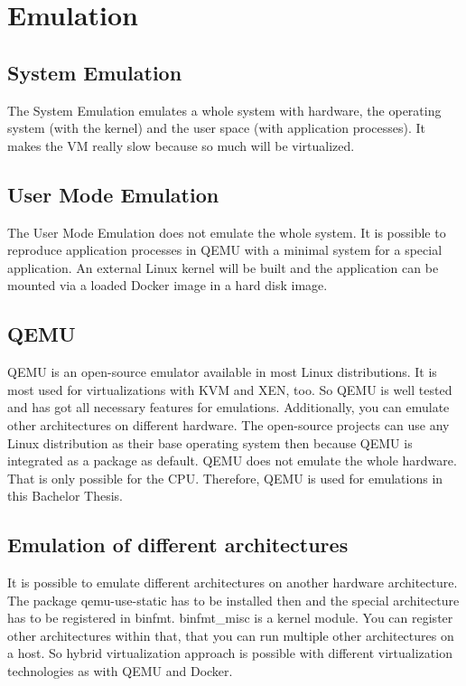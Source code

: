 \chapter{Emulation}\label{ch:emulation}

\section{System Emulation}

The System Emulation emulates a whole system with hardware, the operating system (with the kernel) and the user space (with application processes). It makes the VM really slow because so much will be virtualized.

\section{User Mode Emulation}

The User Mode Emulation does not emulate the whole system. It is possible to reproduce application processes in QEMU with a minimal system for a special application. An external Linux kernel will be built and the application can be mounted via a loaded Docker image in a hard disk image. 

\section{QEMU}

QEMU is an open-source emulator available in most Linux distributions. It is most used for virtualizations with KVM and XEN, too. So QEMU is well tested and has got all necessary features for emulations. Additionally, you can emulate other architectures on different hardware. The open-source projects can use any Linux distribution as their base operating system then because QEMU is integrated as a package as default. QEMU does not emulate the whole hardware. That is only possible for the CPU. Therefore, QEMU is used for emulations in this Bachelor Thesis.

\section{Emulation of different architectures}

It is possible to emulate different architectures on another hardware architecture. The package qemu-use-static has to be installed then and the special architecture has to be registered in binfmt. binfmt\_misc is a kernel module. You can register other architectures within that, that you can run multiple other architectures on a host. So hybrid virtualization approach is possible with different virtualization technologies as with QEMU and Docker.

